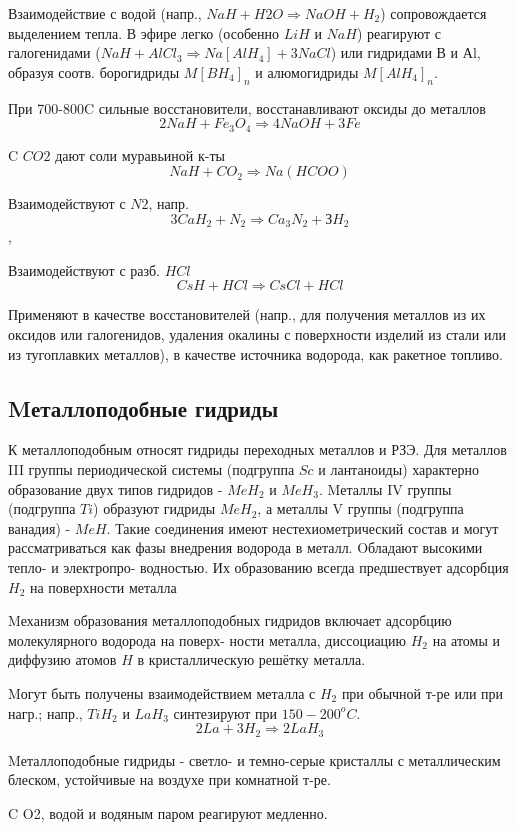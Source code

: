 \documentclass[11pt]{article}
\begin{document}
Взаимодействие с водой (напр., $NaH + H2O \Rightarrow NaOH + H_2$) сопровождается выделением тепла.
В эфире легко (особенно $LiH$ и $NaH$) реагируют с галогенидами ($NaH +AlCl_3 \Rightarrow Na[AlH_4] + 3NaCl$) или
гидридами В и Аl, образуя соотв. борогидриды $M[BH_4]_n$ и алюмогидриды $M[AlH_4]_n$.

При 700-800C сильные восстановители, восстанавливают оксиды до металлов $$2NaH +Fe_3O_4 \Rightarrow 4NaOH + 3Fe$$


C $CO2$ дают соли муравьиной к-ты $$NaH + CO_2 \Rightarrow Na(HCOO)$$

Взаимодействуют с $N2$, напр. $$3CaH_2 + N_2 \Rightarrow Ca_3N_2 + ЗH_2$$,

Взаимодействуют с разб. $HCl$ $$CsH + HCl \Rightarrow CsCl + HCl$$

Применяют в качестве восстановителей (напр., для получения металлов из их оксидов или галогенидов, удаления окалины с поверхности изделий из стали или из тугоплавких металлов), в качестве источника водорода, как ракетное топливо.

\subsection{Mеталлоподобные гидриды}

К металлоподобным относят гидриды переходных металлов и РЗЭ. Для металлов III группы
периодической системы (подгруппа $Sc$ и лантаноиды) характерно образование двух типов гидридов
- $MeH_2$ и $MeH_3$. Mеталлы IV группы (подгруппа $Ti$) образуют гидриды $MeH_2$, а металлы V группы
(подгруппа ванадия) - $MeH$. Такие соединения имеют нестехиометрический состав и могут
рассматриваться как фазы внедрения водорода в металл. Oбладают высокими тепло- и электропро-
водностью. Их образованию всегда предшествует адсорбция $H_2$ на поверхности металла 

Mеханизм образования металлоподобных гидридов включает адсорбцию молекулярного водорода на поверх-
ности металла, диссоциацию $H_2$ на атомы и диффузию атомов $H$ в кристаллическую решётку металла.

Mогут быть получены взаимодействием металла с $H_2$ при обычной т-ре или при нагр.; напр., $TiH_2$ и
$LaH_3$ синтезируют при $150-200^o C$. $$2La + 3H_2 \Rightarrow 2LaH_3$$

Mеталлоподобные гидриды - светло- и темно-серые кристаллы с металлическим блеском, устойчивые на воздухе при комнатной т-ре.

C O2, водой и водяным паром реагируют медленно.
\end{document}
